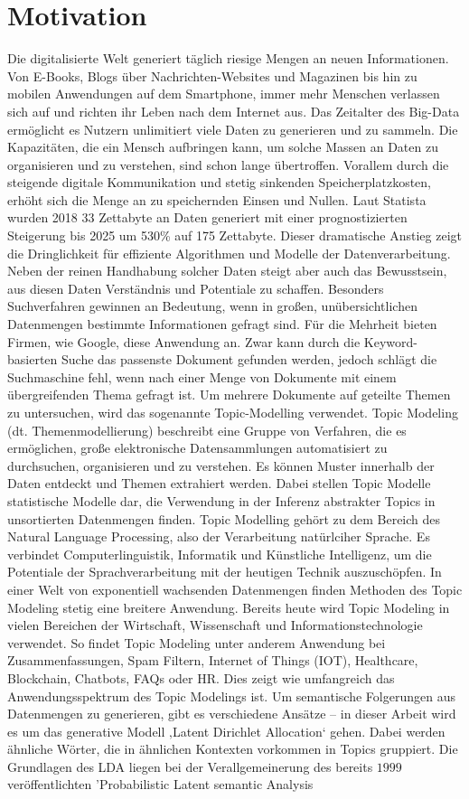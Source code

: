\documentclass[german,version-2020-11]{uzl-thesis}
\begin{document}
\section{Motivation}
Die digitalisierte Welt generiert täglich riesige Mengen an neuen Informationen. Von E-Books, Blogs über Nachrichten-Websites und Magazinen bis hin zu mobilen Anwendungen auf dem Smartphone, immer mehr Menschen verlassen sich auf und richten ihr Leben nach dem Internet aus. Das Zeitalter des Big-Data ermöglicht es Nutzern unlimitiert viele Daten zu generieren und zu sammeln. Die Kapazitäten, die ein Mensch aufbringen kann, um solche Massen an Daten zu organisieren und zu verstehen, sind schon lange übertroffen. Vorallem durch die steigende digitale Kommunikation und stetig sinkenden Speicherplatzkosten, erhöht sich die Menge an zu speichernden Einsen und Nullen. Laut Statista wurden 2018 33 Zettabyte an Daten generiert mit einer prognostizierten Steigerung bis 2025 um 530\% auf 175 Zettabyte. Dieser dramatische Anstieg zeigt die Dringlichkeit für effiziente Algorithmen und Modelle der Datenverarbeitung. Neben der reinen Handhabung solcher Daten steigt aber auch das Bewusstsein, aus diesen Daten Verständnis und Potentiale zu schaffen. Besonders Suchverfahren gewinnen an Bedeutung, wenn in großen, unübersichtlichen Datenmengen bestimmte Informationen gefragt sind. Für die Mehrheit bieten Firmen, wie Google, diese Anwendung an. Zwar kann durch die Keyword-basierten Suche das passenste Dokument gefunden werden, jedoch schlägt die Suchmaschine fehl, wenn nach einer Menge von Dokumente mit einem übergreifenden Thema gefragt ist. Um mehrere Dokumente auf geteilte Themen zu untersuchen, wird das sogenannte Topic-Modelling verwendet. Topic Modeling (dt. Themenmodellierung) beschreibt eine Gruppe von Verfahren, die es ermöglichen, große elektronische Datensammlungen automatisiert zu durchsuchen, organisieren und zu verstehen. Es können Muster innerhalb der Daten entdeckt und Themen extrahiert werden. Dabei stellen Topic Modelle statistische Modelle dar, die Verwendung in der Inferenz abstrakter Topics in unsortierten Datenmengen finden. Topic Modelling gehört zu dem Bereich des Natural Language Processing, also der Verarbeitung natürlciher Sprache. Es verbindet Computerlinguistik, Informatik und Künstliche Intelligenz, um die Potentiale der Sprachverarbeitung mit der heutigen Technik auszuschöpfen. In einer Welt von exponentiell wachsenden Datenmengen finden Methoden des Topic Modeling stetig eine breitere Anwendung. Bereits heute wird Topic Modeling in vielen Bereichen der Wirtschaft, Wissenschaft und Informationstechnologie verwendet. So findet Topic Modeling unter anderem Anwendung bei Zusammenfassungen, Spam Filtern, Internet of Things (IOT), Healthcare, Blockchain, Chatbots, FAQs oder HR. Dies zeigt wie umfangreich das Anwendungsspektrum des Topic Modelings ist. Um semantische Folgerungen aus Datenmengen zu generieren, gibt es verschiedene Ansätze – in dieser Arbeit wird es um das generative Modell ‚Latent Dirichlet Allocation‘ gehen. Dabei werden ähnliche Wörter, die in ähnlichen Kontexten vorkommen in Topics gruppiert. Die Grundlagen des LDA liegen bei der Verallgemeinerung des bereits $1999$ veröffentlichten 'Probabilistic Latent semantic Analysis 
\end{document}
